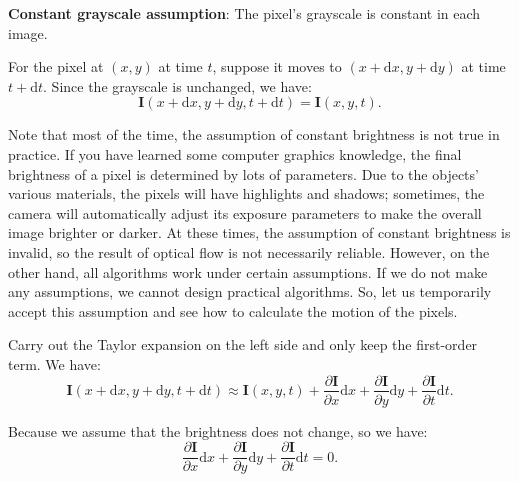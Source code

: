 \textbf{Constant grayscale assumption}: The pixel's grayscale is constant in each image.

For the pixel at $(x,y)$ at time $t$, suppose it moves to $(x+\mathrm{d}x, y+\mathrm{d}y)$ at time $t+\mathrm{d}t$. Since the grayscale is unchanged, we have:
\begin{equation} 
\mathbf{I}(x+\mathrm{d}x, y+\mathrm{d}y, t+\mathrm{d}t) = \mathbf{I} (x,y,t).
\end{equation}

Note that most of the time, the assumption of constant brightness is not true in practice. If you have learned some computer graphics knowledge, the final brightness of a pixel is determined by lots of parameters. Due to the objects' various materials, the pixels will have highlights and shadows; sometimes, the camera will automatically adjust its exposure parameters to make the overall image brighter or darker. At these times, the assumption of constant brightness is invalid, so the result of optical flow is not necessarily reliable. However, on the other hand, all algorithms work under certain assumptions. If we do not make any assumptions, we cannot design practical algorithms. So, let us temporarily accept this assumption and see how to calculate the motion of the pixels.

Carry out the Taylor expansion on the left side and only keep the first-order term. We have:
\begin{equation}
\mathbf{I} \left( {x + \mathrm{d}x,y + \mathrm{d}y,t + \mathrm{d}t} \right) \approx \mathbf{I} \left( {x,y,t} \right) + \frac{{\partial \mathbf{I} }}{{\partial x}}\mathrm{d}x + \frac{{\partial \mathbf{I}}}{{\partial y}}\mathrm{d}y + \frac{{\partial \mathbf{I}}}{{\partial t}}\mathrm{d}t.
\end{equation}

Because we assume that the brightness does not change, so we have:
\begin{equation}
 \frac{{\partial \mathbf{I} }}{{\partial x}}\mathrm{d}x + \frac{{\partial \mathbf{I}}}{{\partial y}}\mathrm{d}y + \frac{{\partial \mathbf{I}}}{{\partial t}}\mathrm{d}t = 0.
\end{equation}

